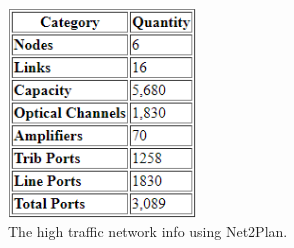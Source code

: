 \begin{figure}[h!]
\centering
\includegraphics[width=5cm]{sdf/heuristic/figures/High_Network_Info_Opaque}
\caption{The high traffic network info using Net2Plan.}
\label{High_Network_Info_Opaque}
\end{figure}
